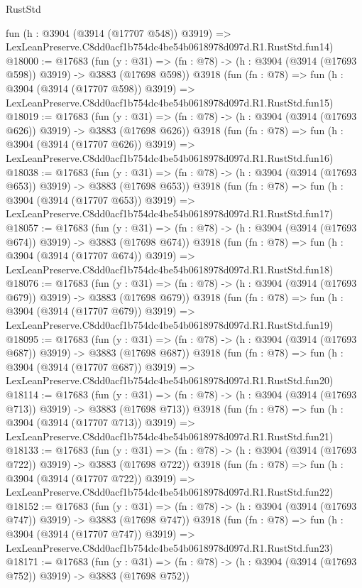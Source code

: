 \begin{lexlean}{RustStd}
\begin{coremodule}
    fun (h : @3904 (@3914 (@17707 @548)) @3919) =>
    LexLeanPreserve.C8dd0acf1b754dc4be54b0618978d097d.R1.RustStd.fun14)
@18000 := @17683
    (fun (y : @31) => (fn : @78) -> (h : @3904 (@3914 (@17693 @598)) @3919) -> @3883 (@17698 @598))
    @3918
    (fun (fn : @78) =>
    fun (h : @3904 (@3914 (@17707 @598)) @3919) =>
    LexLeanPreserve.C8dd0acf1b754dc4be54b0618978d097d.R1.RustStd.fun15)
@18019 := @17683
    (fun (y : @31) => (fn : @78) -> (h : @3904 (@3914 (@17693 @626)) @3919) -> @3883 (@17698 @626))
    @3918
    (fun (fn : @78) =>
    fun (h : @3904 (@3914 (@17707 @626)) @3919) =>
    LexLeanPreserve.C8dd0acf1b754dc4be54b0618978d097d.R1.RustStd.fun16)
@18038 := @17683
    (fun (y : @31) => (fn : @78) -> (h : @3904 (@3914 (@17693 @653)) @3919) -> @3883 (@17698 @653))
    @3918
    (fun (fn : @78) =>
    fun (h : @3904 (@3914 (@17707 @653)) @3919) =>
    LexLeanPreserve.C8dd0acf1b754dc4be54b0618978d097d.R1.RustStd.fun17)
@18057 := @17683
    (fun (y : @31) => (fn : @78) -> (h : @3904 (@3914 (@17693 @674)) @3919) -> @3883 (@17698 @674))
    @3918
    (fun (fn : @78) =>
    fun (h : @3904 (@3914 (@17707 @674)) @3919) =>
    LexLeanPreserve.C8dd0acf1b754dc4be54b0618978d097d.R1.RustStd.fun18)
@18076 := @17683
    (fun (y : @31) => (fn : @78) -> (h : @3904 (@3914 (@17693 @679)) @3919) -> @3883 (@17698 @679))
    @3918
    (fun (fn : @78) =>
    fun (h : @3904 (@3914 (@17707 @679)) @3919) =>
    LexLeanPreserve.C8dd0acf1b754dc4be54b0618978d097d.R1.RustStd.fun19)
@18095 := @17683
    (fun (y : @31) => (fn : @78) -> (h : @3904 (@3914 (@17693 @687)) @3919) -> @3883 (@17698 @687))
    @3918
    (fun (fn : @78) =>
    fun (h : @3904 (@3914 (@17707 @687)) @3919) =>
    LexLeanPreserve.C8dd0acf1b754dc4be54b0618978d097d.R1.RustStd.fun20)
@18114 := @17683
    (fun (y : @31) => (fn : @78) -> (h : @3904 (@3914 (@17693 @713)) @3919) -> @3883 (@17698 @713))
    @3918
    (fun (fn : @78) =>
    fun (h : @3904 (@3914 (@17707 @713)) @3919) =>
    LexLeanPreserve.C8dd0acf1b754dc4be54b0618978d097d.R1.RustStd.fun21)
@18133 := @17683
    (fun (y : @31) => (fn : @78) -> (h : @3904 (@3914 (@17693 @722)) @3919) -> @3883 (@17698 @722))
    @3918
    (fun (fn : @78) =>
    fun (h : @3904 (@3914 (@17707 @722)) @3919) =>
    LexLeanPreserve.C8dd0acf1b754dc4be54b0618978d097d.R1.RustStd.fun22)
@18152 := @17683
    (fun (y : @31) => (fn : @78) -> (h : @3904 (@3914 (@17693 @747)) @3919) -> @3883 (@17698 @747))
    @3918
    (fun (fn : @78) =>
    fun (h : @3904 (@3914 (@17707 @747)) @3919) =>
    LexLeanPreserve.C8dd0acf1b754dc4be54b0618978d097d.R1.RustStd.fun23)
@18171 := @17683
    (fun (y : @31) => (fn : @78) -> (h : @3904 (@3914 (@17693 @752)) @3919) -> @3883 (@17698 @752))

\end{coremodule}
\end{lexlean}
